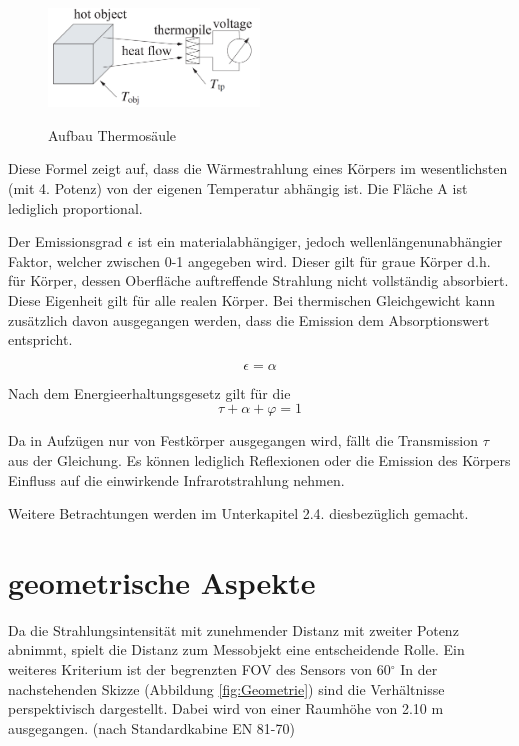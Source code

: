 \begin{figure}[H]
	\centering
	\includegraphics[width=0.5\textwidth]
	{fig/seebeck2.PNG}
	\caption[Aufbau Thermosäule]{Aufbau Thermosäule} \protect\cite{seebeck}
	\label{fig:thermosäule}
\end{figure}

Diese Formel zeigt auf, dass die Wärmestrahlung eines Körpers im wesentlichsten (mit 4. Potenz)
von der eigenen Temperatur abhängig ist. Die Fläche A ist lediglich proportional. 

Der Emissionsgrad $\epsilon$ ist ein materialabhängiger, jedoch wellenlängenunabhängier Faktor, welcher zwischen 0-1 angegeben wird. Dieser gilt für graue Körper d.h. für Körper, dessen Oberfläche auftreffende Strahlung nicht vollständig absorbiert. Diese Eigenheit gilt für alle realen Körper. Bei thermischen Gleichgewicht kann zusätzlich davon ausgegangen werden, dass die Emission dem Absorptionswert entspricht.

\begin{equation}
\label{eq4}
\epsilon = \alpha
\end{equation}

Nach dem Energieerhaltungsgesetz \protect\cite{Thermoformeln} gilt für die 
\begin{equation}
\label{eq5}
\tau  + \alpha + \varphi  = 1
\end{equation}

Da in Aufzügen nur von Festkörper ausgegangen wird, fällt die Transmission $\tau$ aus der Gleichung. Es können lediglich Reflexionen oder die Emission des Körpers Einfluss auf die einwirkende Infrarotstrahlung nehmen.

Weitere Betrachtungen werden im Unterkapitel 2.4. diesbezüglich gemacht.

\section{geometrische Aspekte}
\label{sec:geometrie}

Da die Strahlungsintensität mit zunehmender Distanz mit zweiter Potenz abnimmt, spielt die Distanz zum Messobjekt eine entscheidende Rolle. Ein weiteres Kriterium ist der begrenzten \ac{FOV} des Sensors von 60$^\circ$ In der nachstehenden Skizze (Abbildung \ref{fig:Geometrie}) sind die Verhältnisse perspektivisch dargestellt. Dabei wird von einer Raumhöhe von 2.10 m ausgegangen. (nach Standardkabine EN 81-70)   

